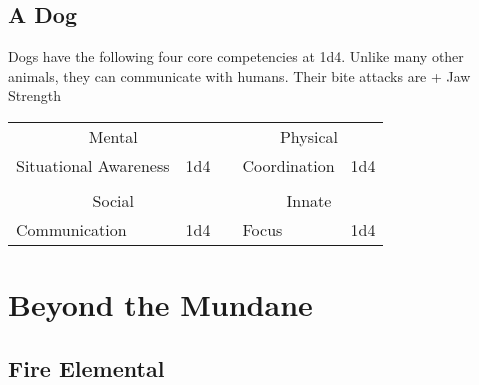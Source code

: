 \documentclass{LegrandOrangeTufteBook}
\begin{document}
\subsection*{A Dog}
Dogs have the following four core competencies at 1d4.
Unlike many other animals, they can communicate with humans.
Their bite attacks are  + Jaw Strength\\
\begin{center}
	\begin{tabular}{lr|clr|}
		\multicolumn{2}{c}{Mental}	&&	\multicolumn{2}{c}{Physical} \\
		\cline{1-2} \cline{4-5}
		Situational Awareness & 1d4				&& 	Coordination & 1d4 \\
		\multicolumn{4}{c}{} \\
		\multicolumn{2}{c}{Social}	&&	\multicolumn{2}{c}{Innate} \\
		\cline{1-2} \cline{4-5}
		Communication & 1d4 			&&	Focus & 1d4 \\
	\end{tabular}
\end{center}


\section*{Beyond the Mundane}

\subsection*{Fire Elemental}
\label{subsec:fire_elemental}
\end{document}
